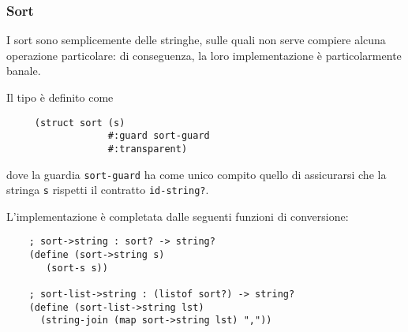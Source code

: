 \subsubsection{Sort}

I sort sono semplicemente delle stringhe, sulle quali non serve compiere
alcuna operazione particolare: di conseguenza, la loro implementazione
\`e particolarmente banale.

Il tipo \`e definito come

\begin{lstlisting}
     (struct sort (s)
                  #:guard sort-guard
                  #:transparent)
\end{lstlisting}

dove la guardia \lstinline{sort-guard} ha come unico compito quello di
assicurarsi che la stringa \lstinline{s} rispetti il contratto
\lstinline{id-string?}.

L'implementazione \`e completata dalle seguenti funzioni di conversione:

\begin{lstlisting}
    ; sort->string : sort? -> string?
    (define (sort->string s)
       (sort-s s))

    ; sort-list->string : (listof sort?) -> string?
    (define (sort-list->string lst)
      (string-join (map sort->string lst) ","))
\end{lstlisting}
